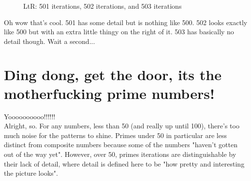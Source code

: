 \documentclass[letterpaper,12pt]{article}
\begin{document}
\begin{figure}[h]
	\noindent{}
	\centering
	\caption{LtR: 501 iterations, 502 iterations, and 503 iterations}
\end{figure}

Oh wow that's cool. 501 has some detail but is nothing like 500. 502 looks exactly like 500 but with an extra little thingy on the right of it.
503 has basically no detail though. Wait a second...

\section{Ding dong, get the door, its the motherfucking prime numbers!}

Yoooooooooo!!!!!!\\
Alright, so. For any numbers, less than 50 (and really up until 100), there's too much noise for the patterns to shine.
Primes under 50 in particular are less distinct from composite numbers because some of the numbers "haven't gotten out of the way yet".
However, over 50, primes iterations are distinguishable by their lack of detail, where detail is defined here to be "how pretty and interesting the picture looks".
\end{document}
